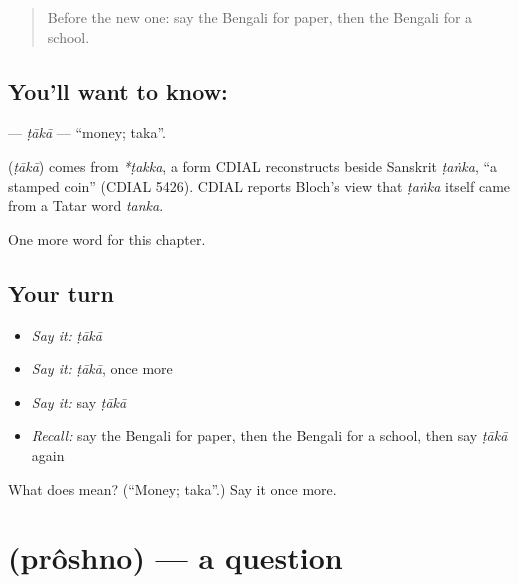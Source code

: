 \label{lesson:BN-C64-taka}



\begin{quote}
Before the new one: say the Bengali for paper, then the Bengali for a school.
\end{quote}

\subsection*{You'll want to know: }
\textbf{} — \emph{ṭākā} — \textquotedblleft{}money; taka\textquotedblright{}.

\begin{cousinweb}
\textbf{} (\emph{ṭākā}) comes from \emph{*ṭakka}, a form CDIAL reconstructs beside Sanskrit \emph{ṭaṅka}, \textquotedblleft{}a stamped coin\textquotedblright{} (CDIAL 5426). CDIAL reports Bloch's view that \emph{ṭaṅka} itself came from a Tatar word \emph{tanka}.
\end{cousinweb}

\begin{grammarlens}[title={What you've built}]
One more word for this chapter.
\end{grammarlens}

\subsection*{Your turn}
\begin{itemize}
\raggedright
  \item \emph{Say it:} \emph{ṭākā}
  \item \emph{Say it:} \emph{ṭākā}, once more
  \item \emph{Say it:} say \emph{ṭākā}
  \item \emph{Recall:} say the Bengali for paper, then the Bengali for a school, then say \emph{ṭākā} again
\end{itemize}

\begin{tcolorbox}[breakable,colback=teal!4,colframe=teal!35!black,title={Before you move on}]
What does  mean? (\textquotedblleft{}Money; taka\textquotedblright{}.) Say it once more.
\end{tcolorbox}
\section[\texorpdfstring{\bn{প্রশ্ন} (prôshno)}{প্রশ্ন (prôshno)}]{ (prôshno) — a question}

